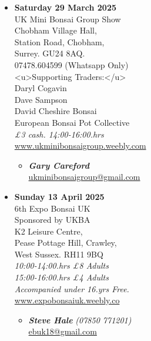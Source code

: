 \begin{itemize}
    \item \textbf{Saturday 29 March 2025}
    \\
    UK Mini Bonsai Group Show \\
    Chobham Village Hall, \\
    Station Road, Chobham, \\
    Surrey. GU24 8AQ. \\
    07478.604599 (Whatsapp Only) \\
    <u>Supporting Traders:</u> \\
    Daryl Cogavin \\
    Dave Sampson \\
    David Cheshire Bonsai \\
    European Bonsai Pot Collective
    \\
    \emph{£3 cash. 14:00-16:00.hrs}
    \\
    \href{https://www.ukminibonsaigroup.weebly.com}{www.ukminibonsaigroup.weebly.com}
    \begin{itemize}
        \item \textbf{\emph{Gary Careford}} \\
        \href{mailto:ukminibonsaigroup@gmail.com}{ukminibonsaigroup@gmail.com}
    \end{itemize}

    \item \textbf{Sunday 13 April 2025}
    \\
    6th Expo Bonsai UK \\
    Sponsored by UKBA \\
    K2 Leisure Centre, \\
    Pease Pottage Hill, Crawley, \\
    West Sussex. RH11 9BQ
    \\
    \emph{10:00-14:00.hrs £8 Adults} \\
    \emph{15:00-16:00.hrs £4 Adults} \\
    \emph{Accompanied under 16.yrs Free.}
    \\
    \href{http://www.expobonsaiuk.weebly.co/}{www.expobonsaiuk.weebly.co}
    \begin{itemize}
        \item \textbf{\emph{Steve Hale}} \emph{(07850 771201)} \\
        \href{mailto:ebuk18@gmail.com}{ebuk18@gmail.com}
    \end{itemize}


\end{itemize}
